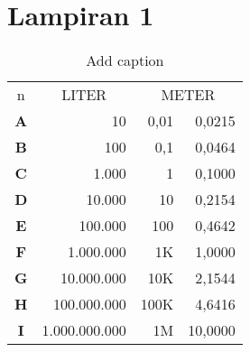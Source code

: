 \chapter*{Lampiran 1}

\begin{table}[htbp]
	\centering
	\caption{Add caption}
	\begin{tabular}{|c|r|r|r|}
		\hline
		\rowcolor[rgb]{ .851,  .851,  .851} \multicolumn{4}{|c|}{Keterangan Type} \bigstrut\\
		\hline
		\rowcolor[rgb]{ .851,  .851,  .851} n & \multicolumn{1}{c|}{\cellcolor[rgb]{ 1,  1,  1}LITER} & \multicolumn{2}{c|}{\cellcolor[rgb]{ 1,  1,  1}METER} \bigstrut\\
		\hline
		\rowcolor[rgb]{ .851,  .851,  .851} \textbf{A} & \cellcolor[rgb]{ 1,  1,  1}10 & \cellcolor[rgb]{ 1,  1,  1}0,01 & \cellcolor[rgb]{ 1,  1,  1}0,0215 \bigstrut\\
		\hline
		\rowcolor[rgb]{ .851,  .851,  .851} \textbf{B} & \cellcolor[rgb]{ 1,  1,  1}100 & \cellcolor[rgb]{ 1,  1,  1}0,1 & \cellcolor[rgb]{ 1,  1,  1}0,0464 \bigstrut\\
		\hline
		\rowcolor[rgb]{ .851,  .851,  .851} \textbf{C} & \cellcolor[rgb]{ 1,  1,  1}1.000 & \cellcolor[rgb]{ 1,  1,  1}1 & \cellcolor[rgb]{ 1,  1,  1}0,1000 \bigstrut\\
		\hline
		\rowcolor[rgb]{ .851,  .851,  .851} \textbf{D} & \cellcolor[rgb]{ 1,  1,  1}10.000 & \cellcolor[rgb]{ 1,  1,  1}10 & \cellcolor[rgb]{ 1,  1,  1}0,2154 \bigstrut\\
		\hline
		\rowcolor[rgb]{ .851,  .851,  .851} \textbf{E} & \cellcolor[rgb]{ 1,  1,  1}100.000 & \cellcolor[rgb]{ 1,  1,  1}100 & \cellcolor[rgb]{ 1,  1,  1}0,4642 \bigstrut\\
		\hline
		\rowcolor[rgb]{ .851,  .851,  .851} \textbf{F} & \cellcolor[rgb]{ 1,  1,  1}1.000.000 & \cellcolor[rgb]{ 1,  1,  1}1K & \cellcolor[rgb]{ 1,  1,  1}1,0000 \bigstrut\\
		\hline
		\rowcolor[rgb]{ .851,  .851,  .851} \textbf{G} & \cellcolor[rgb]{ 1,  1,  1}10.000.000 & \cellcolor[rgb]{ 1,  1,  1}10K & \cellcolor[rgb]{ 1,  1,  1}2,1544 \bigstrut\\
		\hline
		\rowcolor[rgb]{ .851,  .851,  .851} \textbf{H} & \cellcolor[rgb]{ 1,  1,  1}100.000.000 & \cellcolor[rgb]{ 1,  1,  1}100K & \cellcolor[rgb]{ 1,  1,  1}4,6416 \bigstrut\\
		\hline
		\rowcolor[rgb]{ .851,  .851,  .851} \textbf{I} & \cellcolor[rgb]{ 1,  1,  1}1.000.000.000 & \cellcolor[rgb]{ 1,  1,  1}1M & \cellcolor[rgb]{ 1,  1,  1}10,0000 \bigstrut\\

\end{tabular}
\end{table}
